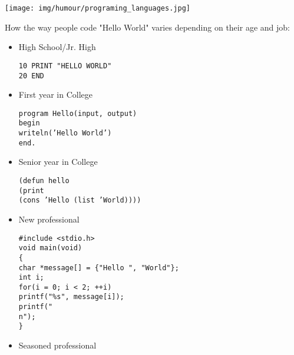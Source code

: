 	\begin{center}\underline{\hspace{5 cm}}\end{center}	
	
	\begin{center}
	\texttt{[image: img/humour/programing\_languages.jpg]}
	\end{center}
	
How the way people code "Hello World" varies depending on their age and job:

\begin{itemize}
	\item High School/Jr. High

 \texttt{10 PRINT "HELLO WORLD"\\
20 END}

	\item First year in College

\texttt{program Hello(input, output)\\
begin\\
writeln('Hello World')\\
end.}

	\item Senior year in College
	
\texttt{(defun hello\\
(print\\
(cons 'Hello (list 'World))))}

	\item New professional

\texttt{\#include <stdio.h>\\
void main(void)\\
\{\\
char *message[] = \{"Hello ", "World"\};\\
int i;\\
for(i = 0; i < 2; ++i)\\
printf("\%s", message[i]);\\
printf("\\n");\\
\}}

	\item Seasoned professional
	

\end{itemize}
